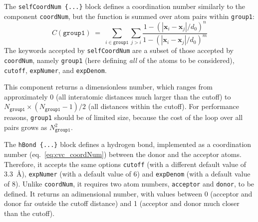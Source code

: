 The \texttt{selfCoordNum \{...\}} block defines
a coordination number similarly to the component \texttt{coordNum},
but the function is summed over atom pairs within \texttt{group1}:
\begin{equation}
  \label{eq:cvc_selfCoordNum}
  C (\mathtt{group1}) \; = \; 
  \sum_{i\in\mathtt{group1}}\sum_{j > i} {
    \frac{1 - (|\mathbf{x}_{i}-\mathbf{x}_{j}|/d_{0})^{n}}{
      1 - (|\mathbf{x}_{i}-\mathbf{x}_{j}|/d_{0})^{m} }
  }
\end{equation}
The keywords accepted by \texttt{selfCoordNum} are a subset of
those accepted by \texttt{coordNum}, namely \texttt{group1}
(here defining \emph{all} of the atoms to be considered),
\texttt{cutoff}, \texttt{expNumer}, and \texttt{expDenom}.

This component returns a dimensionless number, which ranges from
approximately 0 (all interatomic distances much larger than the
cutoff) to $N_{\mathtt{group1}} \times (N_{\mathtt{group1}} - 1) / 2$ (all
distances within the cutoff).  For performance reasons,
\texttt{group1} should be of limited size, because the cost of the
loop over all pairs grows as $N_{\mathtt{group1}}^2$.



  The \texttt{hBond \{...\}} block defines a hydrogen
bond, implemented as a coordination number (eq.~\ref{eq:cvc_coordNum})
between the donor and the acceptor atoms.  Therefore, it accepts the
same options \texttt{cutoff} (with a different default value of
3.3~\AA{}), \texttt{expNumer} (with a default value of 6) and
\texttt{expDenom} (with a default value of 8).  Unlike
\texttt{coordNum}, it requires two atom numbers, \texttt{acceptor} and
\texttt{donor}, to be defined.  It returns an adimensional number,
with values between 0 (acceptor and donor far outside the cutoff
distance) and 1 (acceptor and donor much closer than the cutoff).


